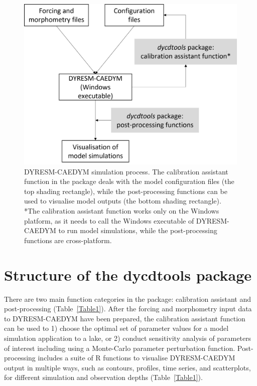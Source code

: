 \begin{figure}[htbp]
  \centering
  \includegraphics[scale=0.6]{Figure1}
  \caption{DYRESM-CAEDYM simulation process. The calibration assistant function in the  package deals with the model configuration files (the top shading rectangle), while the post-processing functions can be used to visualise model outputs (the bottom shading rectangle). *The calibration assistant function  works only on the Windows platform, as it needs to call the Windows executable of DYRESM-CAEDYM to run model simulations, while the post-processing functions are cross-platform.}
  \label{figure1}
\end{figure}

\section{Structure of the dycdtools package}

There are two main function categories in the  package: calibration assistant and post-processing (Table~\ref{Table1}). After the forcing and morphometry input data to DYRESM-CAEDYM have been prepared, the calibration assistant function can be used to 1) choose the optimal set of parameter values for a model simulation application to a lake, or 2) conduct sensitivity analysis of parameters of interest including using a Monte-Carlo parameter perturbation function. Post-processing includes a suite of R functions to visualise DYRESM-CAEDYM output in multiple ways, such as contours, profiles, time series, and scatterplots, for different simulation and observation depths (Table~\ref{Table1}).

